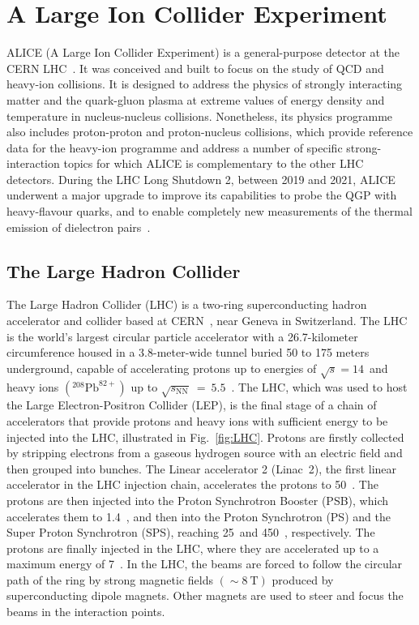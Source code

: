 \chapter{A Large Ion Collider Experiment}

\lettrine[lines=6,findent=0.pt]{A}{LICE}  (A Large Ion Collider Experiment) is a general-purpose detector at the CERN LHC~\cite{ALICE:2008ngc}. It was conceived and built to focus on the study of QCD and heavy-ion collisions. It is designed to address the physics of strongly interacting matter and the quark-gluon plasma at extreme values of energy density and temperature in nucleus-nucleus collisions. Nonetheless, its physics programme also includes proton-proton and proton-nucleus collisions, which provide reference data for the heavy-ion programme and address a number of specific strong-interaction topics for which ALICE is complementary to the other LHC detectors. During the LHC Long Shutdown 2, between 2019 and 2021, ALICE underwent a major upgrade to improve its capabilities to probe the QGP with heavy-flavour quarks, and to enable completely new measurements of the thermal emission of dielectron pairs~\cite{ALICE:2023udb}.


\section{The Large Hadron Collider}
The Large Hadron Collider (LHC) is a two-ring superconducting hadron accelerator and collider based at CERN~\cite{Evans:2008zzb}, near Geneva in Switzerland. The LHC is the world's largest circular particle accelerator with a 26.7-kilometer circumference housed in a 3.8-meter-wide tunnel buried 50 to 175 meters underground, capable of accelerating protons up to energies of $\sqrt{s} = 14$~\tev and heavy ions $({}^{208}\mathrm{Pb}^{82+})$ up to $\sqrt{s_\mathrm{NN}}~=~5.5$~\tev. 
The LHC, which was used to host the Large Electron-Positron Collider (LEP), is the final stage of a chain of accelerators that provide protons and heavy ions with sufficient energy to be injected into the LHC, illustrated in Fig.~\ref{fig:LHC}. Protons are firstly collected by stripping electrons from a gaseous hydrogen source with an electric field and then grouped into bunches. The Linear accelerator 2 (Linac~2), the first linear accelerator in the LHC injection chain, accelerates the protons to 50~\mev. The protons are then injected into the Proton Synchrotron Booster (PSB), which accelerates them to 1.4~\gev, and then into the Proton Synchrotron (PS) and the Super Proton Synchrotron (SPS), reaching 25~\gev and 450~\gev, respectively. The protons are finally injected in the LHC, where they are accelerated up to a maximum energy of 7~\tev. In the LHC, the beams are forced to follow the circular path of the ring by strong magnetic fields $(\sim 8~\mathrm{T})$ produced by superconducting dipole magnets. Other magnets are used to steer and focus the beams in the interaction points. 

